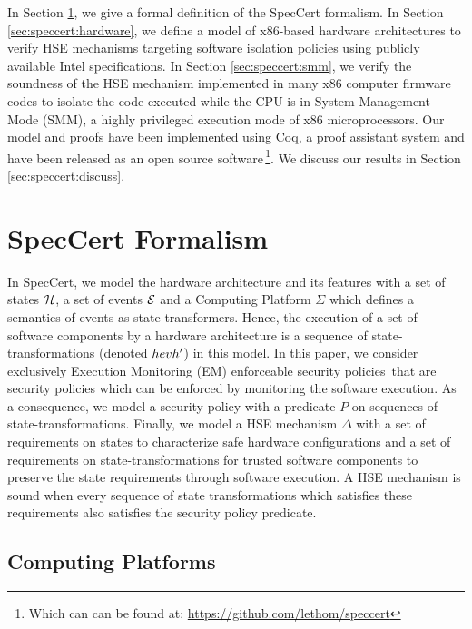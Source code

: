 In Section \ref{sec:speccert:framework}, we give a formal definition of the
SpecCert formalism. In Section \ref{sec:speccert:hardware}, we define a model of
x86-based hardware architectures to verify HSE mechanisms targeting software
isolation policies using publicly available Intel specifications. In Section
\ref{sec:speccert:smm}, we verify the soundness of the HSE mechanism implemented in many
x86 computer firmware codes to isolate the code executed while the CPU is in
System Management Mode (SMM), a highly privileged execution mode of x86
microprocessors. Our model and proofs have been implemented using Coq, a proof
assistant system and have been released as an open source
software\,\footnote{Which can can be found at:
\url{https://github.com/lethom/speccert}}. We discuss our results in Section
\ref{sec:speccert:discuss}.

\section{SpecCert Formalism} \label{sec:speccert:framework}

In SpecCert, we model the hardware architecture and its features with a set of
states $\mathcal{H}$, a set of events $\mathcal{E}$ and a Computing Platform $\Sigma$
which defines a semantics of events as state-transformers. Hence, the execution
of a set of software components by a hardware architecture is a sequence of
state-transformations (denoted $\transitionLTS{Ez}{h}{ev}{h'}$) in this model.
In this paper, we consider exclusively Execution Monitoring (EM) enforceable
security policies\,\cite{schneider2000enforceable,basin2013enforceable} that are
security policies which can be enforced by monitoring the software execution. As
a consequence, we model a security policy with a predicate $P$ on sequences of
state-transformations.  Finally, we model a HSE mechanism $\Delta$ with a set of
requirements on states to characterize safe hardware configurations and a set of
requirements on state-transformations for trusted software components to
preserve the state requirements through software execution. A HSE mechanism is
sound when every sequence of state transformations which satisfies these
requirements also satisfies the security policy predicate.

\subsection{Computing Platforms} \label{subsec:speccert:computing}

